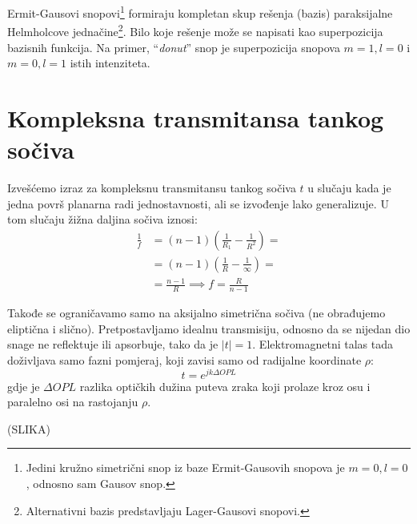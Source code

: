 \documentclass[fleqn]{report}
\begin{document}
Ermit-Gausovi snopovi\footnote{Jedini kružno simetrični snop iz baze Ermit-Gausovih snopova je $m = 0, l = 0$, odnosno sam Gausov snop.} formiraju kompletan skup rešenja (bazis) paraksijalne Helmholcove jednačine\footnote{Alternativni bazis predstavljaju Lager-Gausovi snopovi.}.
Bilo koje rešenje može se napisati kao superpozicija bazisnih funkcija.
Na primer, \enquote{\emph{donut}} snop je superpozicija snopova $m = 1, l = 0$ i $m = 0, l = 1$ istih intenziteta.



\appendix

\chapter{Kompleksna transmitansa tankog sočiva} \label{dodatak - t sociva}

Izvešćemo izraz za kompleksnu transmitansu tankog sočiva $t$ u slučaju kada je jedna površ planarna radi jednostavnosti, ali se izvođenje lako generalizuje.
U tom slučaju žižna daljina sočiva iznosi:
\begin{align*}
    \frac{1}{f} & = (n - 1)\left(\frac{1}{R_1} - \frac{1}{R^2}\right) =  \\
                & = (n - 1)\left(\frac{1}{R} - \frac{1}{\infty}\right) = \\
                & = \frac{n - 1}{R} \implies f = \frac{R}{n - 1}
\end{align*}

Takođe se ograničavamo samo na aksijalno simetrična sočiva (ne obrađujemo eliptična i slično).
Pretpostavljamo idealnu transmisiju, odnosno da se nijedan dio snage ne reflektuje ili apsorbuje, tako da je  $|t| = 1$.
Elektromagnetni talas tada doživljava samo fazni pomjeraj, koji zavisi samo od radijalne koordinate $\rho$:
\begin{equation*}
    t = e^{jk\Delta OPL}
\end{equation*}
gdje je $\Delta OPL$ razlika optičkih dužina puteva zraka koji prolaze kroz osu i paralelno osi na rastojanju $\rho$.

(SLIKA)
\end{document}
